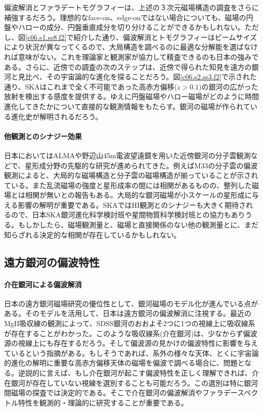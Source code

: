 偏波解消とファラデートモグラフィーは、上述の３次元磁場構造の調査をさらに補強するだろう。理想的なface-on、edge-onではない場合についても、磁場の円盤やハローの成分、円盤垂直成分を切り分けることができるかもしれない。ただし、図\ref{c06.s1.ss8.f2}で紹介した通り、偏波解消とトモグラフィーはビームサイズにより状況が異なってくるので、大局構造を調べるのに最適な分解能を選ばなければ意味がない。これを理論家と観測家が協力して精査できるのも日本の強みである。さらに、近傍での調査の次のステップは、近傍で得られた知見を遠方の銀河と見比べ、その宇宙論的な進化を探ることだろう。図\ref{c06.s2.ss3.f2}で示された通り、SKAはこれまで全く不可能であった高赤方偏移($z>0.1$)の銀河の広がった放射を検出する感度を提供する。ゆえに円盤磁場やハロー磁場がどのように時間進化してきたかについて直接的な観測情報をもたらす。銀河の磁場が作られている進化史が解明されるだろう。

\paragraph{他観測とのシナジー効果}

日本においてはALMAや野辺山45m電波望遠鏡を用いた近傍銀河の分子雲観測などで、星形成分野の先駆的な研究が進められてきた。例えばM33の分子雲の偏波観測によると、大局的な磁場構造と分子雲の磁場構造が揃っていることが示されている\citep{2011Natur.479..499L}。また乱流磁場の強度と星形成率の間には相関があるものの、整列した磁場とは相関が無いとの報告もある\citep{2013A&A...557A.129T}。大局的な銀河磁場が小スケールの星形成に与える影響の解明が重要である。SKAではHI観測とのシナジーも大きく期待されるので、日本SKA銀河進化科学検討班や星間物質科学検討班との協力もありうる。もしかしたら、磁場観測量と、磁場と直接関係のない他の観測量とに、まだ知らざれる決定的な相関が存在しているかもしれない。


\subsection{遠方銀河の偏波特性}
\label{c06.s3.ss4}

\paragraph{介在銀河による偏波解消}

日本の遠方銀河磁場研究の優位性として、銀河磁場のモデル化が進んでいる点がある。そのモデルを活用して、日本は遠方銀河の偏波解消に注視する。最近のMgII吸収線の観測\citep{2013ApJ...770..130Z}によって、SDSS銀河のおおよそ2つに1つの視線上に吸収線系が存在することがわかった。このような吸収線系(介在銀河)は、少なからず偏波源の視線上にも存在するだろう。そして偏波源の見かけの偏波特性に影響を与えているという指摘がある\citep{2012ApJ...761..144B,2014ApJS..212...15F}。もしそうであれば、系外の様々な天体、とくに宇宙論的進化の解明に重要な高赤方偏移天体の磁場を偏波で調べる場合に、問題となる。逆説的に言えば、もし介在銀河が起こす偏波特性を正しく理解できれば、介在銀河が存在していない視線を選別することも可能だろう。この選別は特に銀河間磁場の探査では決定的である。そこで介在銀河の偏波解消やファラデースペクトル特性を観測的・理論的に研究することが重要である。

